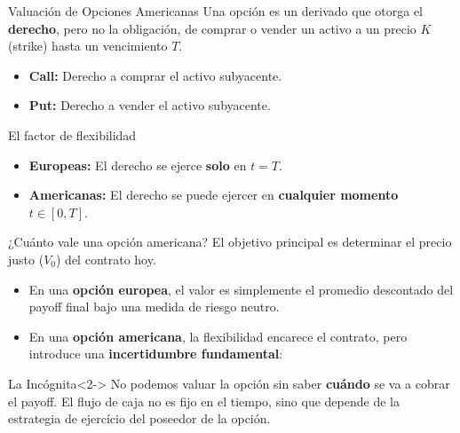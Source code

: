 \documentclass[xcolor=dvipsnames, handout]{beamer}
\begin{document}
\begin{frame}{Valuaci\'on de Opciones Americanas}
Una opci\'on es un derivado que otorga el \textbf{derecho}, pero no la obligaci\'on, de comprar o vender un activo a un precio $K$ (strike) hasta un vencimiento $T$.

\begin{itemize}
    \item \textbf{Call:} Derecho a comprar el activo subyacente.
    \item \textbf{Put:} Derecho a vender el activo subyacente.
\end{itemize}

\begin{block}{El factor de flexibilidad}
    \begin{itemize}
        \item \textbf{Europeas:} El derecho se ejerce \textbf{solo} en $t = T$.
        \item \textbf{Americanas:} El derecho se puede ejercer en \textbf{cualquier momento} $t \in [0, T]$.
    \end{itemize}
\end{block}

\end{frame}

\begin{frame}{¿Cu\'anto vale una opci\'on americana?}
El objetivo principal es determinar el precio justo ($V_0$) del contrato hoy.

\begin{itemize}
    \item En una \textbf{opci\'on europea}, el valor es simplemente el promedio descontado del payoff final bajo una medida de riesgo neutro.
    \item En una \textbf{opci\'on americana}, la flexibilidad encarece el contrato, pero introduce una \textbf{incertidumbre fundamental}:
\end{itemize}

\begin{alertblock}{La Incógnita}<2->
    No podemos valuar la opci\'on sin saber \textbf{cuándo} se va a cobrar el payoff. El flujo de caja no es fijo en el tiempo, sino que depende de la estrategia de ejerc\'icio del poseedor de la opci\'on.
\end{alertblock}
\end{frame}
\end{document}
